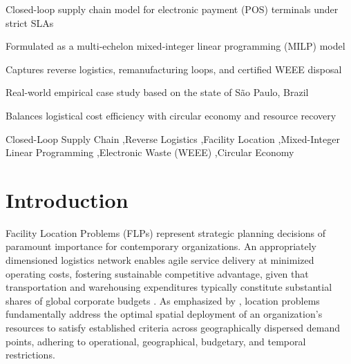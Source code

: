 \documentclass[preprint,12pt,authoryear]{elsarticle}
\begin{document}
\begin{frontmatter}

\begin{highlights}
\item Closed-loop supply chain model for electronic payment (POS) terminals under strict SLAs
\item Formulated as a multi-echelon mixed-integer linear programming (MILP) model
\item Captures reverse logistics, remanufacturing loops, and certified WEEE disposal
\item Real-world empirical case study based on the state of S\~ao Paulo, Brazil
\item Balances logistical cost efficiency with circular economy and resource recovery
\end{highlights}

\begin{keyword}
Closed-Loop Supply Chain \sep Reverse Logistics \sep Facility Location \sep Mixed-Integer Linear Programming \sep Electronic Waste (WEEE) \sep Circular Economy
\end{keyword}

\end{frontmatter}

\section{Introduction}
\label{sec:intro}

Facility Location Problems (FLPs) represent strategic planning decisions of paramount importance for contemporary organizations. An appropriately dimensioned logistics network enables agile service delivery at minimized operating costs, fostering sustainable competitive advantage, given that transportation and warehousing expenditures typically constitute substantial shares of global corporate budgets \citep{Owen1998Strategic}. As emphasized by \citet{oliveira2012sistema}, location problems fundamentally address the optimal spatial deployment of an organization's resources to satisfy established criteria across geographically dispersed demand points, adhering to operational, geographical, budgetary, and temporal restrictions.
\end{document}
